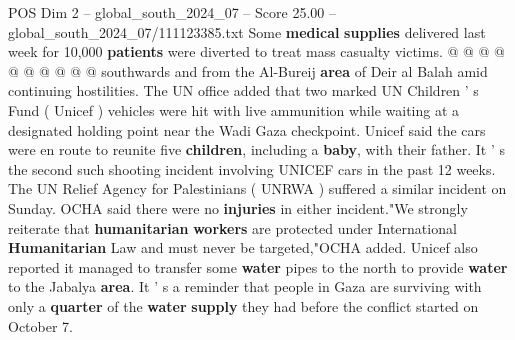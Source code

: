 \begin{textsample}{POS Dim 2 – global\_south\_2024\_07 – Score 25.00 – global\_south\_2024\_07/111123385.txt}
Some \textbf{medical} \textbf{supplies} delivered last week for 10,000 \textbf{patients} were diverted to treat mass casualty victims. @ @ @ @ @ @ @ @ @ @ southwards and from the Al-Bureij \textbf{area} of Deir al Balah amid continuing hostilities.
The UN office added that two marked UN Children ' s Fund ( Unicef ) vehicles were hit with live ammunition while waiting at a designated holding point near the Wadi Gaza checkpoint.
Unicef said the cars were en route to reunite five \textbf{children}, including a \textbf{baby}, with their father.
It ' s the second such shooting incident involving UNICEF cars in the past 12 weeks.
The UN Relief Agency for Palestinians ( UNRWA ) suffered a similar incident on Sunday.
OCHA said there were no \textbf{injuries} in either incident."We strongly reiterate that \textbf{humanitarian} \textbf{workers} are protected under International \textbf{Humanitarian} Law and must never be targeted,"OCHA added.
Unicef also reported it managed to transfer some \textbf{water} pipes to the north to provide \textbf{water} to the Jabalya \textbf{area}.
It ' s a reminder that people in Gaza are surviving with only a \textbf{quarter} of the \textbf{water} \textbf{supply} they had before the conflict started on October 7.

\end{textsample}
